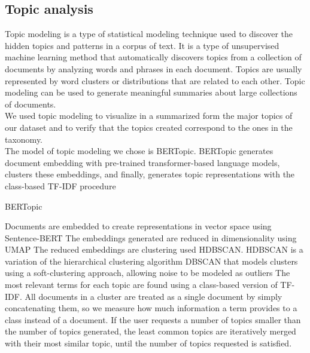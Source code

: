 
\subsection*{Topic analysis}
Topic modeling is a type of statistical modeling technique used to discover the hidden topics and patterns in a corpus of text. It is a type of unsupervised machine learning method that automatically discovers topics from a collection of documents by analyzing words and phrases in each document. Topics are usually represented by word clusters or distributions that are related to each other. Topic modeling can be used to generate meaningful summaries about large collections of documents. \\
We used topic modeling to visualize in a summarized form the major topics of our dataset and to verify that the topics created correspond to the ones in the taxonomy. \\
The model of topic modeling we chose is BERTopic\cite{grootendorst2022bertopic}. BERTopic generates document embedding with pre-trained transformer-based language models, clusters these embeddings, and finally, generates topic representations with the class-based TF-IDF procedure
\begin{algorithm}
    \caption*{BERTopic}
    \begin{algorithmic}[1]
      \State Documents are embedded to create representations in vector space using Sentence-BERT
      \State The embeddings generated are reduced in dimensionality using UMAP
      \State The reduced embeddings are clustering used HDBSCAN. HDBSCAN is a variation of the hierarchical clustering algorithm DBSCAN that models clusters using a soft-clustering approach, allowing noise to be modeled as outliers
      \State The most relevant terms for each topic are found using a class-based version of TF-IDF. All documents in a cluster are treated as a single document by simply concatenating them, so we measure how much information a term provides to a class instead of a document.
      \State If the user requests a number of topics smaller than the number of topics generated, the least common topics are iteratively merged with their most similar topic, until the number of topics requested is satisfied.
    \end{algorithmic}
\end{algorithm}

